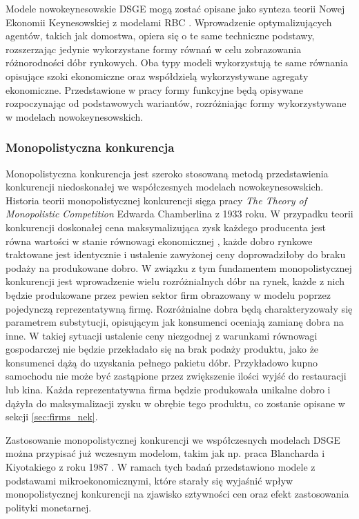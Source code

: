 Modele nowokeynesowskie DSGE mogą zostać opisane jako synteza teorii Nowej Ekonomii Keynesowskiej z modelami RBC \cite{gali_gertler}. Wprowadzenie optymalizujących agentów, takich jak domostwa, opiera się o te same techniczne podstawy, rozszerzając jedynie wykorzystane formy równań w celu zobrazowania różnorodności dóbr rynkowych. Oba typy modeli wykorzystują te same równania opisujące szoki ekonomiczne oraz współdzielą wykorzystywane agregaty ekonomiczne. Przedstawione w pracy formy funkcyjne będą opisywane rozpoczynając od podstawowych wariantów, rozróżniając formy wykorzystywane w modelach nowokeynesowskich.

\subsubsection{Monopolistyczna konkurencja}
\label{sec:monopol_comp}

Monopolistyczna konkurencja jest szeroko stosowaną metodą przedstawienia konkurencji niedoskonałej we współczesnych modelach nowokeynesowskich. Historia teorii monopolistycznej konkurencji sięga pracy \emph{The Theory of Monopolistic Competition} Edwarda Chamberlina z 1933 roku. W przypadku teorii konkurencji doskonałej cena maksymalizująca zysk każdego producenta jest równa wartości w stanie równowagi ekonomicznej \cite{mono_comp_theory}, każde dobro rynkowe traktowane jest identycznie i ustalenie zawyżonej ceny doprowadziłoby do braku podaży na produkowane dobro. W związku z tym fundamentem monopolistycznej konkurencji jest wprowadzenie wielu rozróżnialnych dóbr na rynek, każde z nich będzie produkowane przez pewien sektor firm obrazowany w modelu poprzez pojedynczą reprezentatywną firmę. Rozróżnialne dobra będą charakteryzowały się parametrem substytucji, opisującym jak konsumenci oceniają zamianę dobra na inne. W takiej sytuacji ustalenie ceny niezgodnej z warunkami równowagi gospodarczej nie będzie przekładało się na brak podaży produktu, jako że konsumenci dążą do uzyskania pełnego pakietu dóbr. Przykładowo kupno samochodu nie może być zastąpione przez zwiększenie ilości wyjść do restauracji lub kina. Każda reprezentatywna firma będzie produkowała unikalne dobro i dążyła do maksymalizacji zysku w obrębie tego produktu, co zostanie opisane w sekcji \ref{sec:firms_nek}.

Zastosowanie monopolistycznej konkurencji we współczesnych modelach DSGE można przypisać już wczesnym modelom, takim jak np. praca Blancharda i Kiyotakiego z roku 1987  \cite{blanchard_mono_comp}. W ramach tych badań przedstawiono modele z podstawami mikroekonomicznymi, które starały się wyjaśnić wpływ monopolistycznej konkurencji na zjawisko sztywności cen oraz efekt zastosowania polityki monetarnej. 


